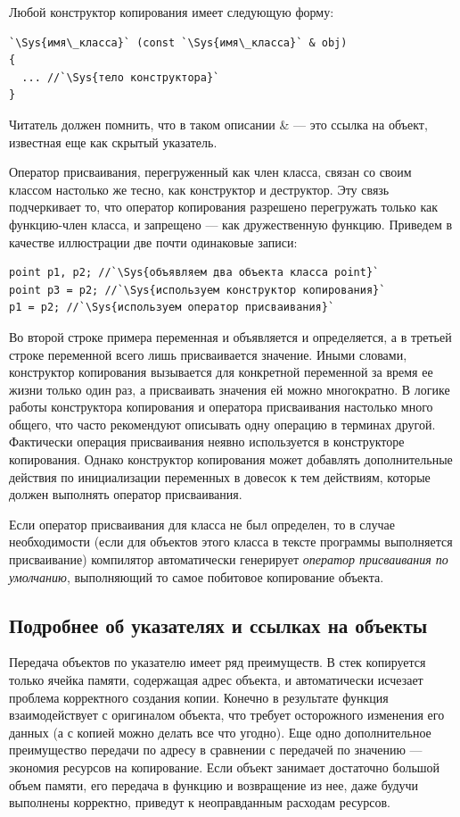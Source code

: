 Любой конструктор копирования имеет следующую форму:
\begin{lstlisting}
`\Sys{имя\_класса}` (const `\Sys{имя\_класса}` & obj) 
{
  ... //`\Sys{тело конструктора}`
}
\end{lstlisting}

Читатель должен помнить, что в таком описании \& --- это ссылка на объект, известная еще
как скрытый указатель.

Оператор присваивания, перегруженный как член класса, связан со своим классом настолько же тесно, как конструктор и
деструктор. Эту связь подчеркивает то, что оператор копирования разрешено перегружать только как функцию-член класса, и
запрещено --- как дружественную функцию. Приведем в качестве иллюстрации две почти одинаковые записи:
\begin{lstlisting}
point p1, p2; //`\Sys{объявляем два объекта класса point}`
point p3 = p2; //`\Sys{используем конструктор копирования}`
p1 = p2; //`\Sys{используем оператор присваивания}`
\end{lstlisting}

Во второй строке примера переменная   и объявляется и определяется, а в третьей  строке
переменной  всего лишь присваивается значение. Иными словами, конструктор копирования
вызывается для конкретной переменной за время ее жизни только один раз, а присваивать значения ей можно многократно. В
логике работы конструктора копирования и оператора присваивания настолько много общего, что часто рекомендуют
описывать одну операцию в терминах другой. Фактически операция  присваивания неявно используется в конструкторе
копирования. Однако конструктор копирования может добавлять дополнительные действия по инициализации переменных в
довесок к тем действиям, которые должен выполнять оператор присваивания.

Если оператор присваивания для класса не был определен, то в случае необходимости (если для объектов этого класса в
тексте программы выполняется присваивание) компилятор автоматически генерирует \emph{оператор присваивания
по умолчанию},  выполняющий то самое побитовое копирование объекта.

\subsection[Подробнее об указателях и ссылках на объекты]{Подробнее об указателях и ссылках на объекты}\label{ch10:2.2}

Передача объектов по указателю имеет ряд преимуществ.  В стек копируется только
ячейка памяти, содержащая адрес объекта, и автоматически исчезает проблема корректного создания копии. Конечно в
результате функция взаимодействует с оригиналом объекта, что требует осторожного изменения его данных (а с копией можно
делать все что угодно). Еще одно дополнительное преимущество передачи по адресу в сравнении с передачей по значению ---
экономия ресурсов на копирование. Если объект занимает достаточно большой объем памяти, его передача в функцию и
возвращение из нее, даже будучи выполнены корректно, приведут к неоправданным расходам ресурсов.

